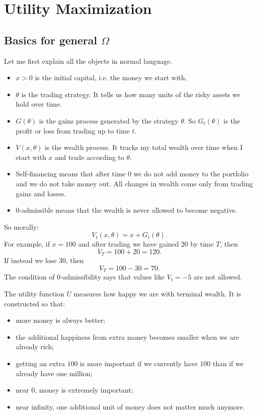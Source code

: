 \section{Utility Maximization}

\subsection{Basics for general $\Omega$}

Let me first explain all the objects in normal language.

\begin{itemize}
    \item $x>0$ is the initial capital, i.e. the money we start with.
    \item $\theta$ is the trading strategy. It tells us how many units of the risky assets we hold over time.
    \item $G(\theta)$ is the gains process generated by the strategy $\theta$. So $G_t(\theta)$ is the profit or loss from trading up to time $t$.
    \item $V(x,\theta)$ is the wealth process. It tracks my total wealth over time when I start with $x$ and trade according to $\theta$.
    \item Self-financing means that after time $0$ we do not add money to the portfolio and we do not take money out. All changes in wealth come only from trading gains and losses.
    \item $0$-admissible means that the wealth is never allowed to become negative.
\end{itemize}

So morally:
\[
    V_t(x,\theta)=x+G_t(\theta).
\]
For example, if $x=100$ and after trading we have gained $20$ by time $T$, then
\[
    V_T=100+20=120.
\]
If instead we lose $30$, then
\[
    V_T=100-30=70.
\]
The condition of $0$-admissibility says that values like $V_t=-5$ are not allowed.

The utility function $U$ measures how happy we are with terminal wealth. It is constructed so that:
\begin{itemize}
    \item more money is always better;
    \item the additional happiness from extra money becomes smaller when we are already rich;
    \item getting an extra $100$ is more important if we currently have $100$ than if we already have one million;
    \item near $0$, money is extremely important;
    \item near infinity, one additional unit of money does not matter much anymore.
\end{itemize}

